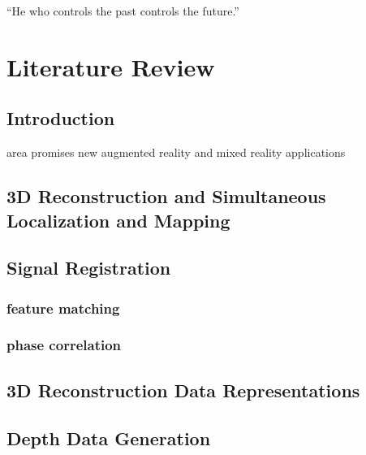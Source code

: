 \begin{savequote}[8cm]
  ``He who controls the past controls the future.''
\end{savequote}
\makeatletter
\chapter{Literature Review}

\section{Introduction}

area promises new augmented reality and mixed reality applications

\section{3D Reconstruction and Simultaneous Localization and Mapping}



\section{Signal Registration}

\subsection{feature matching}



\subsection{phase correlation}



\section{3D Reconstruction Data Representations}




\section{Depth Data Generation}



